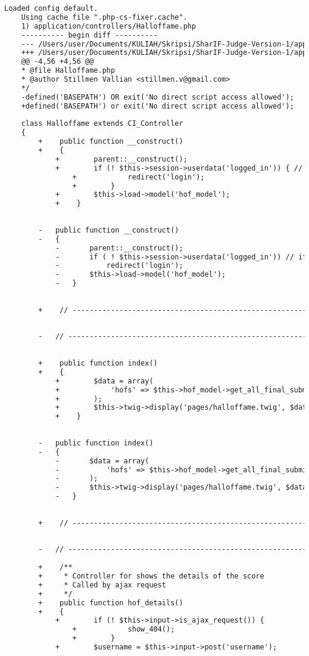 \begin{lstlisting}[language=diff, caption=Perubahan pada kode Halloffame.php]
	Loaded config default.
	Using cache file ".php-cs-fixer.cache".
	1) application/controllers/Halloffame.php
	---------- begin diff ----------
	--- /Users/user/Documents/KULIAH/Skripsi/SharIF-Judge-Version-1/application/controllers/Halloffame.php
	+++ /Users/user/Documents/KULIAH/Skripsi/SharIF-Judge-Version-1/application/controllers/Halloffame.php
	@@ -4,56 +4,56 @@
	* @file Halloffame.php
	* @author Stillmen Vallian <stillmen.v@gmail.com>
	*/
	-defined('BASEPATH') OR exit('No direct script access allowed');
	+defined('BASEPATH') or exit('No direct script access allowed');
	
	class Halloffame extends CI_Controller
	{
		+    public function __construct()
		+    {
			+        parent::__construct();
			+        if (! $this->session->userdata('logged_in')) { // if not logged in
				+            redirect('login');
				+        }
			+        $this->load->model('hof_model');
			+    }
		
		
		-	public function __construct()
		-	{
			-		parent::__construct();
			-		if ( ! $this->session->userdata('logged_in')) // if not logged in
			-			redirect('login');
			-		$this->load->model('hof_model');
			-	}
		
		
		+    // ------------------------------------------------------------------------
		
		
		-	// ------------------------------------------------------------------------
		
		
		+    public function index()
		+    {
			+        $data = array(
			+            'hofs' => $this->hof_model->get_all_final_submission()
			+        );
			+        $this->twig->display('pages/halloffame.twig', $data);
			+    }
		
		
		-	public function index()
		-	{
			-		$data = array(
			-			'hofs' => $this->hof_model->get_all_final_submission()
			-		);
			-		$this->twig->display('pages/halloffame.twig', $data);
			-	}
		
		
		+    // ------------------------------------------------------------------------
		
		
		-	// ------------------------------------------------------------------------
		
		+    /**
		+     * Controller for shows the details of the score
		+     * Called by ajax request
		+     */
		+    public function hof_details()
		+    {
			+        if (! $this->input->is_ajax_request()) {
				+            show_404();
				+        }
			+        $username = $this->input->post('username');
			

\end{lstlisting}
